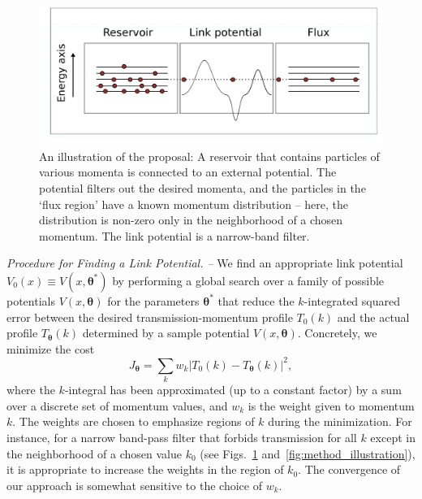 \documentclass[twocolumn,amsmath,amssymb,showpacs,prl,superscriptaddress,aps]{revtex4-1}
\begin{document}
\begin{figure}
\centerline{\includegraphics[scale=0.3]{figure1new.pdf}}
\caption{An illustration of the proposal: A reservoir that contains particles of various momenta is connected to an external potential. 
The potential filters out the desired momenta, and the particles in the `flux region' have a known momentum distribution -- here, 
the distribution is non-zero only in the neighborhood of a chosen momentum. The link potential is a narrow-band filter.
  }
\label{fig:Figure1}
\end{figure}

{\it Procedure for Finding a Link Potential. --} 
We find an appropriate link potential $V_0(x) \equiv V(x,\bm{\theta}^*)$ by performing a global search over a family of possible potentials $V(x,\bm{\theta})$ for the parameters $\bm{\theta}^*$ that reduce the $k$-integrated squared error between the desired transmission-momentum profile $T_0(k)$ and the actual profile $T_{\bm\theta}(k)$ determined by a sample potential $V(x, \bm{\theta})$. Concretely, we minimize the cost
\begin{equation}\label{eq:cost1}
  J_{\bm{\theta}} = \sum_kw_k\left|T_0(k) - T_{\bm{\theta}}(k)\right|^2,
\end{equation}
where the $k$-integral has been approximated (up to a constant factor) by a sum over a discrete set of momentum values, and $w_k$ is the weight given to momentum $k$. The weights are chosen to emphasize regions of $k$ during the minimization. For instance, for a narrow band-pass filter that forbids transmission for all $k$ except in the neighborhood of a chosen value $k_0$ (see Figs.~\ref{fig:Figure1} and~\ref{fig:method_illustration}), it is appropriate to increase the weights in the region of $k_0$. The convergence of our approach is somewhat sensitive to the choice of $w_k$.
\end{document}
